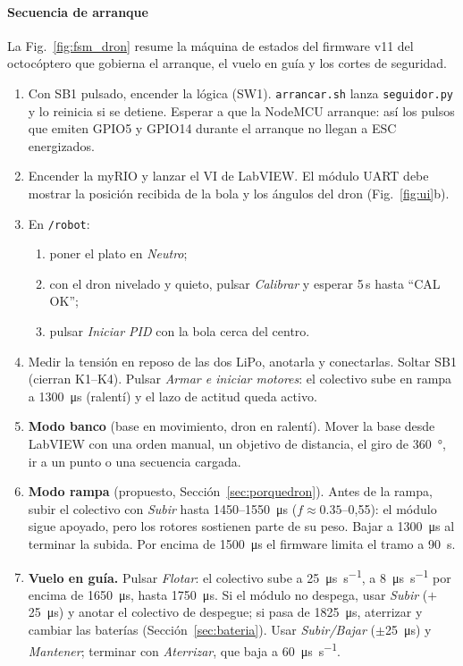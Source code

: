 \paragraph{Secuencia de arranque}
La Fig.~\ref{fig:fsm_dron} resume la máquina de estados del firmware v11 del octocóptero que gobierna el arranque, el vuelo en guía y los cortes de seguridad.
\begin{enumerate}
  \item Con SB1 pulsado, encender la lógica (SW1). \texttt{arrancar.sh} lanza \texttt{seguidor.py} y lo reinicia si se detiene. Esperar a que la NodeMCU arranque: así los pulsos que emiten GPIO5 y GPIO14 durante el arranque no llegan a ESC energizados.
  \item Encender la myRIO y lanzar el VI de LabVIEW. El módulo UART debe mostrar la posición recibida de la bola y los ángulos del dron (Fig.~\ref{fig:ui}b).
  \item En \texttt{/robot}:
  \begin{enumerate}[label=\alph*.]
    \item poner el plato en \emph{Neutro};
    \item con el dron nivelado y quieto, pulsar \emph{Calibrar} y esperar 5\,s hasta ``CAL OK'';
    \item pulsar \emph{Iniciar PID} con la bola cerca del centro.
  \end{enumerate}
  \item Medir la tensión en reposo de las dos LiPo, anotarla y conectarlas. Soltar SB1 (cierran K1--K4). Pulsar \emph{Armar e iniciar motores}: el colectivo sube en rampa a \SI{1300}{\micro\second} (ralentí) y el lazo de actitud queda activo.
  \item \textbf{Modo banco} (base en movimiento, dron en ralentí). Mover la base desde LabVIEW con una orden manual, un objetivo de distancia, el giro de \SI{360}{\degree}, ir a un punto o una secuencia cargada.
  \item \textbf{Modo rampa} (propuesto, Sección~\ref{sec:porquedron}). Antes de la rampa, subir el colectivo con \emph{Subir} hasta 1450--\SI{1550}{\micro\second} ($f\approx0.35$--0,55): el módulo sigue apoyado, pero los rotores sostienen parte de su peso. Bajar a \SI{1300}{\micro\second} al terminar la subida. Por encima de \SI{1500}{\micro\second} el firmware limita el tramo a \SI{90}{\second}.
  \item \textbf{Vuelo en guía.} Pulsar \emph{Flotar}: el colectivo sube a \SI{25}{\micro\second\per\second}, a \SI{8}{\micro\second\per\second} por encima de \SI{1650}{\micro\second}, hasta \SI{1750}{\micro\second}. Si el módulo no despega, usar \emph{Subir} ($+$\SI{25}{\micro\second}) y anotar el colectivo de despegue; si pasa de \SI{1825}{\micro\second}, aterrizar y cambiar las baterías (Sección~\ref{sec:bateria}). Usar \emph{Subir/Bajar} ($\pm$\SI{25}{\micro\second}) y \emph{Mantener}; terminar con \emph{Aterrizar}, que baja a \SI{60}{\micro\second\per\second}.
\end{enumerate}

